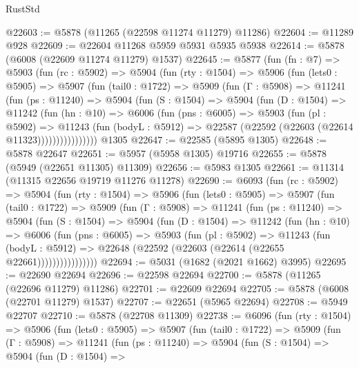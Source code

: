 \begin{lexlean}{RustStd}
\begin{coremodule}
@22603 := @5878 (@11265 (@22598 @11274 @11279) @11286)
@22604 := @11289 @928
@22609 := @22604 @11268 @5959 @5931 @5935 @5938
@22614 := @5878 (@6008 (@22609 @11274 @11279) @1537)
@22645 := @5877
    (fun (fn : @7) =>
    @5903
      (fun (rc : @5902) =>
      @5904
        (fun (rty : @1504) =>
        @5906
          (fun (lets0 : @5905) =>
          @5907
            (fun (tail0 : @1722) =>
            @5909
              (fun (Γ : @5908) =>
              @11241
                (fun (ps : @11240) =>
                @5904
                  (fun (S : @1504) =>
                  @5904
                    (fun (D : @1504) =>
                    @11242
                      (fun (hn : @10) =>
                      @6006
                        (fun (pns : @6005) =>
                        @5903
                          (fun (pl : @5902) =>
                          @11243
                            (fun (bodyL : @5912) =>
                            @22587 (@22592 (@22603 (@22614 @11323))))))))))))))))
    @1305
@22647 := @22585 (@5895 @1305)
@22648 := @5878 @22647
@22651 := @5957 (@5958 @1305) @19716
@22655 := @5878 (@5949 (@22651 @11305) @11309)
@22656 := @5983 @1305
@22661 := @11314 (@11315 @22656 @19719 @11276 @11278)
@22690 := @6093
    (fun (rc : @5902) =>
    @5904
      (fun (rty : @1504) =>
      @5906
        (fun (lets0 : @5905) =>
        @5907
          (fun (tail0 : @1722) =>
          @5909
            (fun (Γ : @5908) =>
            @11241
              (fun (ps : @11240) =>
              @5904
                (fun (S : @1504) =>
                @5904
                  (fun (D : @1504) =>
                  @11242
                    (fun (hn : @10) =>
                    @6006
                      (fun (pns : @6005) =>
                      @5903
                        (fun (pl : @5902) =>
                        @11243
                          (fun (bodyL : @5912) =>
                          @22648 (@22592 (@22603 (@22614 (@22655 @22661))))))))))))))))
@22694 := @5031 (@1682 (@2021 @1662) @3995)
@22695 := @22690 @22694
@22696 := @22598 @22694
@22700 := @5878 (@11265 (@22696 @11279) @11286)
@22701 := @22609 @22694
@22705 := @5878 (@6008 (@22701 @11279) @1537)
@22707 := @22651 (@5965 @22694)
@22708 := @5949 @22707
@22710 := @5878 (@22708 @11309)
@22738 := @6096
    (fun (rty : @1504) =>
    @5906
      (fun (lets0 : @5905) =>
      @5907
        (fun (tail0 : @1722) =>
        @5909
          (fun (Γ : @5908) =>
          @11241
            (fun (ps : @11240) =>
            @5904
              (fun (S : @1504) =>
              @5904
                (fun (D : @1504) =>

\end{coremodule}
\end{lexlean}
